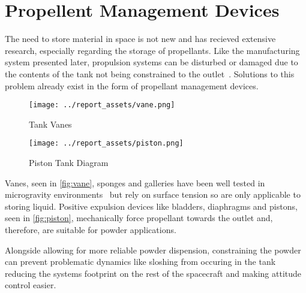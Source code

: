 \section{Propellent Management Devices}
The need to store material in space is not new and has recieved extensive research, especially regarding the storage of propellants. Like the manufacturing system presented later, propulsion systems can be disturbed or damaged due to the contents of the tank not being constrained to the outlet~\cite{Hartwig2016}. Solutions to this problem already exist in the form of propellant management devices.
\begin{figure}[htbp]
    \centering
    
    \begin{minipage}{0.25\textwidth}
        \centering
        \texttt{[image: ../report\_assets/vane.png]}
        \caption{Tank Vanes~\cite{Hartwig2016}}\label{fig:vane}
    \end{minipage}
    \hspace{3em}
    \begin{minipage}{0.47\textwidth}
        \centering
        \texttt{[image: ../report\_assets/piston.png]}
        \caption{Piston Tank Diagram~\cite{TANG2023118406}}\label{fig:piston}
    \end{minipage}
    
\end{figure}
Vanes, seen in \autoref{fig:vane}, sponges and galleries have been well tested in microgravity environments~\cite{} but rely on surface tension so are only applicable to storing liquid. Positive expulsion devices like bladders, diaphragms and pistons, seen in \autoref{fig:piston}, mechanically force propellant towards the outlet and, therefore, are suitable for powder applications. 

Alongside allowing for more reliable powder dispension, constraining the powder can prevent problematic dynamics like sloshing from occuring in the tank reducing the systems footprint on the rest of the spacecraft and making attitude control easier.


